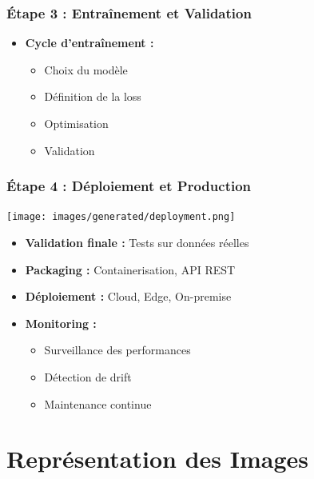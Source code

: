 \documentclass{beamer}
\begin{document}
\begin{frame}
    \frametitle{Étape 3 : Entraînement et Validation}
    \begin{itemize}
        \item \textbf{Cycle d'entraînement :}
        \begin{itemize}
            \item Choix du modèle
            \item Définition de la loss
            \item Optimisation
            \item Validation
        \end{itemize}
    \end{itemize}
\end{frame}

\begin{frame}
    \frametitle{Étape 4 : Déploiement et Production}
    \begin{center}
        \texttt{[image: images/generated/deployment.png]}
    \end{center}
    \begin{itemize}
        \item \textbf{Validation finale :} Tests sur données réelles
        \item \textbf{Packaging :} Containerisation, API REST
        \item \textbf{Déploiement :} Cloud, Edge, On-premise
        \item \textbf{Monitoring :} 
        \begin{itemize}
            \item Surveillance des performances
            \item Détection de drift
            \item Maintenance continue
        \end{itemize}
    \end{itemize}
\end{frame}

\section{Représentation des Images}
\end{document}
